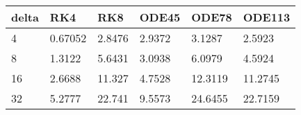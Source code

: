 \begin{tabular}{llllll}
delta & RK4 & RK8 & ODE45 & ODE78 & ODE113 \\ 
\hline 
4 & 0.67052 & 2.8476 & 2.9372 & 3.1287 & 2.5923 \\ 
8 & 1.3122 & 5.6431 & 3.0938 & 6.0979 & 4.5924 \\ 
16 & 2.6688 & 11.327 & 4.7528 & 12.3119 & 11.2745 \\ 
32 & 5.2777 & 22.741 & 9.5573 & 24.6455 & 22.7159 \\ 
\hline 
\end{tabular}